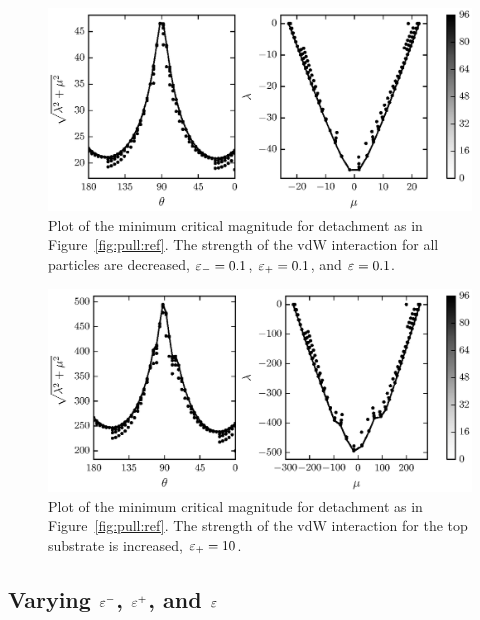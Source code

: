 	\begin{figure}
		\begin{center}
			\includegraphics{./fig/ch3/pull/eb0.1_et0.1_e0.1/grid.eps}
		\end{center}		
		\caption{Plot of the minimum critical magnitude for detachment as in Figure~\ref{fig:pull:ref}. The strength of the vdW interaction for all particles are decreased, $\varepsilon_-=0.1$, $\varepsilon_+=0.1$, and $\varepsilon=0.1$.
		\label{fig:pull:eb0.1_et0.1_e0.1}}
	\end{figure}
	
	\begin{figure}
		\begin{center}
			\includegraphics{./fig/ch3/pull/et10/grid.eps}
		\end{center}		
		\caption{Plot of the minimum critical magnitude for detachment as in Figure~\ref{fig:pull:ref}. The strength of the vdW interaction for the top substrate is increased, $\varepsilon_+=10$.
		\label{fig:pull:et10}}
	\end{figure}

\subsection{Varying $\varepsilon^-$, $\varepsilon^+$, and $\varepsilon$} \label{section:detachment:eps}

